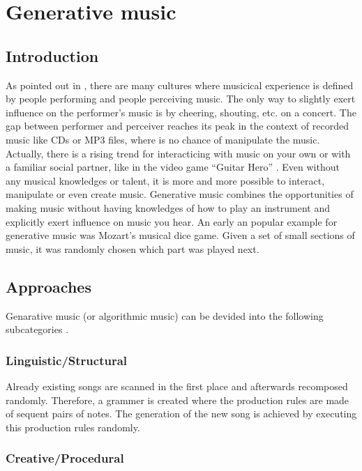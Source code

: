 	\section{Generative music}
	

	\subsection{Introduction}

	As pointed out in \cite{Chandra2012}, there are many cultures where musicical experience is defined by people performing and people perceiving music. 
	The only way to slightly exert influence on the performer's music is by cheering, shouting, etc. on a concert. 
	The gap between performer and perceiver reaches its peak in the context of recorded music like CDs or MP3 files, where is no chance of manipulate the music. 
	Actually, there is a rising trend for interacticing with music on your own or with a familiar social partner, like in the video game "`Guitar Hero"' \cite{Chandra2012, Planck2009}. 
	Even without any musical knowledges or talent, it is more and more possible to interact, manipulate or even create music.
	Generative music combines the opportunities of making music without having knowledges of how to play an instrument and explicitly exert influence on music you hear.
	An early an popular example for generative music was Mozart's musical dice game. Given a set of small sections of music, it was randomly chosen which part was played next.



	\subsection{Approaches} 

	Genarative music (or algorithmic music) can be devided into the following subcategories \cite{Wooller2005}.

	\subsubsection{Linguistic/Structural}

	Already existing songs are scanned in the first place and afterwards recomposed randomly. Therefore, a grammer is created where the production rules are made of sequent pairs of notes. The generation of the new song is achieved by executing this production rules randomly.

	\subsubsection{Creative/Procedural}

